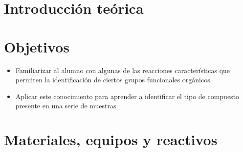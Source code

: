 
\section{Introducción teórica}



\section{Objetivos}

\begin{itemize}
    \item Familiarizar al alumno con algunas de las reacciones características que permiten la identificación de ciertos grupos funcionales orgánicos 
    \item Aplicar este conocimiento para aprender a identificar el tipo de compuesto presente en una serie de muestras
\end{itemize}

\section{Materiales, equipos y reactivos}

